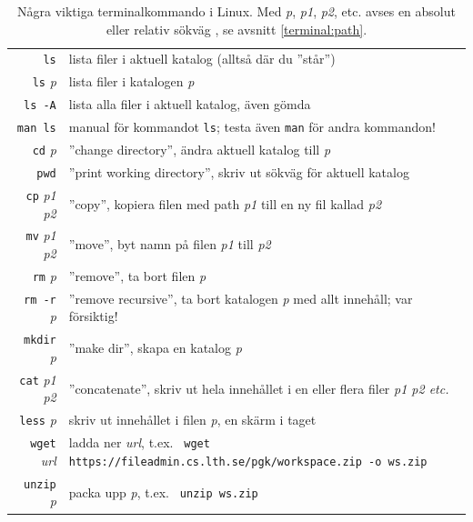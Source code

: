 \begin{table}[H]
\renewcommand{\arraystretch}{1.25}
   
\begin{tabular}{@{}r | l}
\texttt{ls} & lista filer i aktuell katalog (alltså där du ''står'')\\
\texttt{ls} \textit{p}  & lista filer i katalogen  \textit{p} \\
\texttt{ls -A} & lista alla filer i aktuell katalog, även gömda \\
\texttt{man ls} & manual för kommandot \texttt{ls}; testa även \texttt{man} för andra kommandon! \\
\texttt{cd} \textit{p} & ''change directory'', ändra aktuell katalog till \textit{p}\\
\texttt{pwd} & ''print working directory'', skriv ut sökväg för aktuell katalog \\
\texttt{cp} \textit{p1 p2} & ''copy'', kopiera filen med path \textit{p1} till en ny fil kallad \textit{p2} \\
\texttt{mv} \textit{p1 p2} & ''move'', byt namn på filen \textit{p1} till \textit{p2}  \\
\texttt{rm} \textit{p} & ''remove'', ta bort filen \textit{p}\\
\texttt{rm -r} \textit{p} & ''remove recursive'', ta bort katalogen \textit{p} med allt innehåll; var försiktig!\\
\texttt{mkdir} \textit{p} & ''make dir'', skapa en katalog \textit{p}\\
\texttt{cat} \textit{p1 p2}& ''concatenate'', skriv ut hela innehållet i en eller flera filer \textit{p1 p2 etc.}\\
\texttt{less} \textit{p}& skriv ut innehållet i filen \textit{p}, en skärm i taget\\
\texttt{wget} \textit{url}&ladda ner \textit{url}, t.ex. \texttt{ wget https://fileadmin.cs.lth.se/pgk/workspace.zip -o ws.zip}\\
\texttt{unzip} \textit{p}& packa upp \textit{p}, t.ex. \texttt{ unzip ws.zip}\\
\end{tabular}

    \caption{Några viktiga terminalkommando i Linux. Med \textit{p}, \textit{p1}, \textit{p2}, etc.  avses en absolut eller relativ sökväg , se avsnitt \ref{terminal:path}.}
    \label{fig:terminal:commands}

\end{table}

